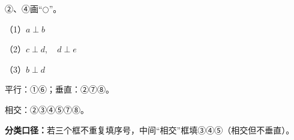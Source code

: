 
\begingroup\color{answerred}②、④画“$\bigcirc$”。\par\endgroup
{}
\begingroup\color{answerred}\noindent（1）$a\perp b$\par
\noindent（2）$c\perp d,\quad d\perp e$\par
\noindent（3）$b\perp d$\par\par\endgroup
{}
\begingroup\color{answerred}平行：①⑥；垂直：②⑦⑧。\par 相交：②③④⑤⑦⑧。\par \textbf{分类口径：}若三个框不重复填序号，中间“相交”框填③④⑤（相交但不垂直）。\par\endgroup
